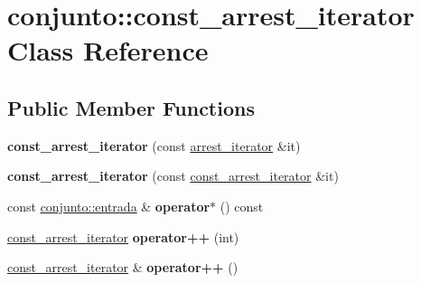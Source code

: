 \hypertarget{classconjunto_1_1const__arrest__iterator}{\section{conjunto\-:\-:const\-\_\-arrest\-\_\-iterator Class Reference}
\label{classconjunto_1_1const__arrest__iterator}
}
\subsection*{Public Member Functions}
\begin{DoxyCompactItemize}
\item 
\hypertarget{classconjunto_1_1const__arrest__iterator_aab0fb16a64c360f64005a205a577b6de}{{\bfseries const\-\_\-arrest\-\_\-iterator} (const \hyperlink{classconjunto_1_1arrest__iterator}{arrest\-\_\-iterator} \&it)}\label{classconjunto_1_1const__arrest__iterator_aab0fb16a64c360f64005a205a577b6de}

\item 
\hypertarget{classconjunto_1_1const__arrest__iterator_ad4eb101c5b76e1d44a7d5d674b134476}{{\bfseries const\-\_\-arrest\-\_\-iterator} (const \hyperlink{classconjunto_1_1const__arrest__iterator}{const\-\_\-arrest\-\_\-iterator} \&it)}\label{classconjunto_1_1const__arrest__iterator_ad4eb101c5b76e1d44a7d5d674b134476}

\item 
\hypertarget{classconjunto_1_1const__arrest__iterator_ae87ac3e09e461500f03c54edf2ed5ca2}{const \hyperlink{classconjunto_a09cad766dd65de73e51eae21f9d22585}{conjunto\-::entrada} \& {\bfseries operator$\ast$} () const }\label{classconjunto_1_1const__arrest__iterator_ae87ac3e09e461500f03c54edf2ed5ca2}

\item 
\hypertarget{classconjunto_1_1const__arrest__iterator_a539e5969ce8cf044407477823deaf949}{\hyperlink{classconjunto_1_1const__arrest__iterator}{const\-\_\-arrest\-\_\-iterator} {\bfseries operator++} (int)}\label{classconjunto_1_1const__arrest__iterator_a539e5969ce8cf044407477823deaf949}

\item 
\hypertarget{classconjunto_1_1const__arrest__iterator_a8edd6f45bc1c85aab672865bb529c899}{\hyperlink{classconjunto_1_1const__arrest__iterator}{const\-\_\-arrest\-\_\-iterator} \& {\bfseries operator++} ()}\label{classconjunto_1_1const__arrest__iterator_a8edd6f45bc1c85aab672865bb529c899}


\end{DoxyCompactItemize}
